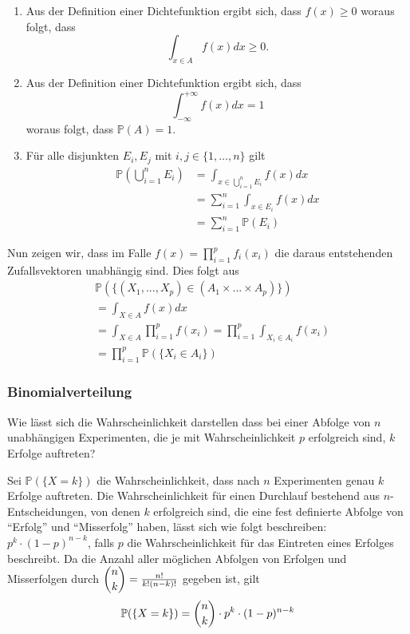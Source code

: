 \begin{enumerate}
\item Aus der Definition einer Dichtefunktion ergibt sich, dass $f(x)\geq 0$ woraus folgt, dass \begin{equation*}\int_{x\in A}f(x)dx\geq 0. \end{equation*}
\item Aus der Definition einer Dichtefunktion ergibt sich, dass \begin{equation*}\int_{-\infty}^{+\infty}f(x)dx= 1 \end{equation*} woraus folgt, dass $\mathbb{P}(A)=1$.
\item Für alle disjunkten $E_i,E_j$ mit $i,j\in \{1,\dots ,n\}$ gilt
\begin{align*}
\mathbb{P}\left(\bigcup_{i=1}^{n} E_i\right)&=\int_{x\in \bigcup_{i=1}^{n}E_i}{f(x)dx}\\
&=\sum_{i=1}^{n}{\int_{x\in E_i}{f(x)dx}}\\
&=\sum_{i=1}^{n}{\mathbb{P}(E_i)}
\end{align*}
\end{enumerate}
Nun zeigen wir, dass im Falle $f(x) = \prod_{i=1}^p f_i(x_i)$ die daraus entstehenden Zufallsvektoren unabhängig sind. Dies folgt aus
\begin{align*}
&\mathbb{P}(\{(X_{1}, ... , X_{p}) \in (A_{1} \times ... \times A_{p})\} )\\ &= \int_{X \in A}{f(x)dx}\\
&= \int_{X \in A}{\prod_{i=1}^{p}{f(x_{i})}} = \prod_{i=1}^{p}{\int_{X_{i} \in A_{i}}{f(x_{i})}}\\
&= \prod_{i=1}^{p}{\mathbb{P} (\{X_{i} \in A_{i}\})}
\end{align*}

\subsubsection{Binomialverteilung}
Wie lässt sich die Wahrscheinlichkeit darstellen dass bei einer Abfolge von $n$ unabhängigen Experimenten, die je mit Wahrscheinlichkeit $p$ erfolgreich sind, $k$ Erfolge auftreten?

Sei $\mathbb{P}(\{X=k\})$ die Wahrscheinlichkeit, dass nach $n$ Experimenten genau $k$ Erfolge auftreten.
Die Wahrscheinlichkeit für einen Durchlauf bestehend aus $n$-Entscheidungen, von denen $k$ erfolgreich sind, die eine fest definierte Abfolge von \enquote{Erfolg} und \enquote{Misserfolg} haben, lässt sich wie folgt beschreiben:
$p^k\cdot (1-p)^{n-k}$, falls $p$ die Wahrscheinlichkeit für das Eintreten eines Erfolges beschreibt. Da die Anzahl aller möglichen Abfolgen von Erfolgen und Misserfolgen durch $\dbinom{n}{k} = \frac{n!}{k!(n-k)!}$ gegeben ist, gilt
\begin{equation*}
\mathbb{P}(\{X=k\})=\dbinom{n}{k}\cdot p^k\cdot (1-p)^{n-k}
\end{equation*}
